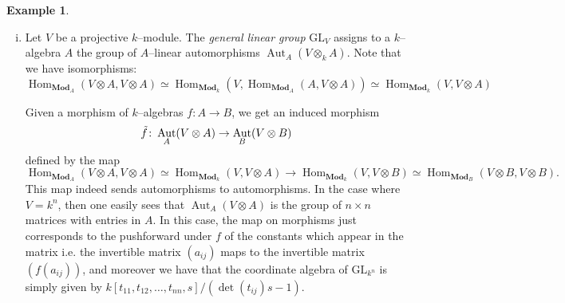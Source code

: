 \documentclass{article}
\theoremstyle{plain}
\theoremstyle{definition}
\newtheorem{Ex}[Th]{Example}
\DeclareMathOperator{\Hom}{Hom}
\DeclareMathOperator{\Aut}{Aut}
\newcommand{\GL}{\mathrm{GL}}
\begin{document}
\begin{Ex}
\begin{enumerate}[(i)]
    \item Let $V$ be a projective $k$--module. The \textit{general linear group} $\GL_V$ assigns to a $k$--algebra $A$ the group of $A$--linear automorphisms $\Aut_A(V\otimes_k A)$. Note that we have isomorphisms: 
    \[
    \Hom_{\textbf{Mod}_A}(V\otimes A, V\otimes A)\simeq \Hom_{\textbf{Mod}_k}(V, \Hom_{\textbf{Mod}_A}(A, V\otimes A)) \simeq \Hom_{\textbf{Mod}_k}(V, V\otimes A)
    \]

    Given a morphism of $k$--algebras $f\colon A\to B$, we get an induced morphism 
    \[
    \Tilde{f}\colon \Aut_A(V\otimes A)\to \Aut_B(V\otimes B)
    \]
    defined by the map 
    \[
    \Hom_{\textbf{Mod}_A}(V\otimes A, V\otimes A)\simeq\Hom_{\textbf{Mod}_k}(V, V\otimes A) \to \Hom_{\textbf{Mod}_k}(V, V\otimes B)\simeq\Hom_{\textbf{Mod}_B}(V\otimes B, V\otimes B).
    \]
    This map indeed sends automorphisms to automorphisms. In the case where $V=k^n$, then one easily sees that $\Aut_A(V\otimes A)$ is the group of $n\times n$ matrices with entries in $A$. In this case, the map on morphisms just corresponds to the pushforward under $f$ of the constants which appear in the matrix i.e. the invertible matrix $(a_{ij})$ maps to the invertible matrix $(f(a_{ij}))$, and  moreover we have that the coordinate algebra of $\GL_{k^n}$ is simply given by $k[t_{11}, t_{12}, \dots, t_{nn}, s]/(\det(t_{ij})s-1)$.
    

\end{enumerate}
\end{Ex}
\end{document}
